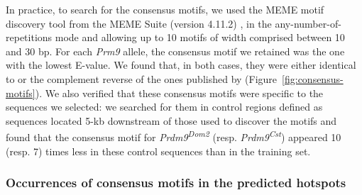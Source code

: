 In practice, to search for the consensus motifs, we used the MEME motif discovery tool \citep{bailey2006meme} from the MEME Suite (version 4.11.2) \citep{bailey2009meme}, in the any-number-of-repetitions mode and allowing up to 10 motifs of width comprised between 10 and 30 bp.
For each \textit{Prm9} allele, the consensus motif we retained was the one with the lowest E-value.
We found that, in both cases, they were either identical to or the complement reverse of the ones published by \citet{baker2015prdm9} (Figure~\ref{fig:consensus-motifs}).
We also verified that these consensus motifs were specific to the sequences we selected: 
we searched for them in control regions defined as sequences located 5-kb downstream of those used to discover the motifs and found that the consensus motif for \textit{Prdm9\textsuperscript{Dom2}} (resp. \textit{Prdm9\textsuperscript{Cst}}) appeared 10 (resp. 7) times less in these control sequences than in the training set.


\subsubsection{Occurrences of consensus motifs in the predicted hotspots}

